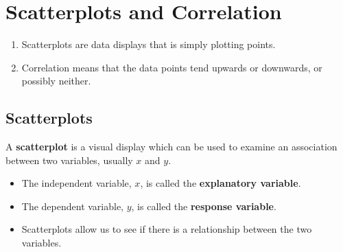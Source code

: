 \documentclass{article}
\begin{document}
\section*{Scatterplots and Correlation}

\begin{tcolorbox}[colframe=orange!70!white, coltitle=black, title=\textbf{Summary}]
\begin{enumerate}
    \item Scatterplots are data displays that is simply plotting points.
    \item Correlation means that the data points tend upwards or downwards, or possibly neither.
\end{enumerate}
\end{tcolorbox}
\vspace{0.75in}

\subsection*{Scatterplots}

\vspace{0.25in}

\begin{tcolorbox}[colframe=green!20!black, colback = green!30!white,title=\textbf{Scatterplot}]
A \textbf{scatterplot} is a visual display which can be used to examine an association between two variables, usually $x$ and $y$.
\end{tcolorbox}
\vspace{0.5in}

\begin{itemize}
    \item The independent variable, $x$, is called the {\color{blue}\textbf{explanatory variable}}.
    \item The dependent variable, $y$, is called the {\color{blue}\textbf{response variable}}.
    \item Scatterplots allow us to see if there is a relationship between the two variables.
\end{itemize}
\vspace{1.5in}
\end{document}
